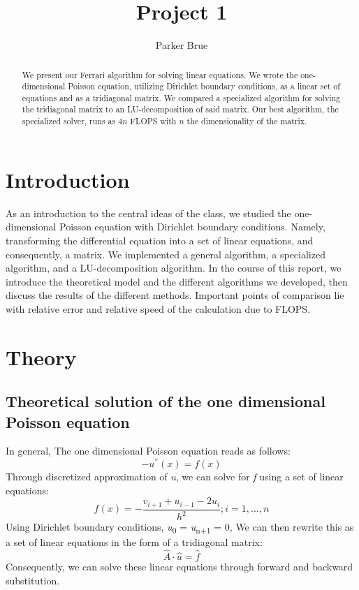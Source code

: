 \documentclass[10pt,showpacs,preprintnumbers,footinbib,amsmath,amssymb,aps,prl,twocolumn,groupedaddress,superscriptaddress,showkeys]{revtex4-1}
\begin{document}
\title{Project 1}
\author{Parker Brue}
\begin{abstract}
We present our Ferrari algorithm for solving linear equations. We wrote the one-dimensional Poisson equation, utilizing Dirichlet boundary conditions, as a linear set of equations and as a tridiagonal matrix. We compared a specialized algorithm for solving the tridiagonal matrix to an LU-decomposition of said matrix.  Our best algorithm, the specialized solver, runs as $4n$ FLOPS with $n$ the dimensionality of the matrix.
\end{abstract}
\maketitle

\section{Introduction}
As an introduction to the central ideas of the class, we studied the one-dimensional Poisson equation with Dirichlet boundary conditions. Namely, transforming the differential equation into a set of linear equations, and consequently, a matrix. We implemented a general algorithm, a specialized algorithm, and a LU-decomposition algorithm. In the course of this report, we introduce the theoretical model and the different algorithms  we developed, then discuss the results of the different methods. Important points of comparison lie with relative error and relative speed of the calculation due to FLOPS. 

\section{Theory}
	\subsection{Theoretical solution of the one dimensional Poisson equation}	
In general, The one dimensional Poisson equation reads as follows: \begin{equation} -u^{''}(x) = f(x)     \end{equation}  Through discretized approximation of {\it u}, we can solve for {\it f} using a set of linear equations: \begin{equation}
	f(x)=-\frac{v_{i+1}+u_{i-1}-2u_{i}}{h^{2}}      ;      i=1,...,n
	\end{equation}
Using Dirichlet boundary conditions, {\it u}\textsubscript{0} = {\it u}\textsubscript{n+1} = 0,  We can then rewrite this as a set of linear equations in the form of a tridiagonal matrix: \begin{equation}	
	\hat{A} \cdot \hat{u} = \hat{f}
	\end{equation}
Consequently, we can solve these linear equations through forward and backward substitution.
\end{document}
